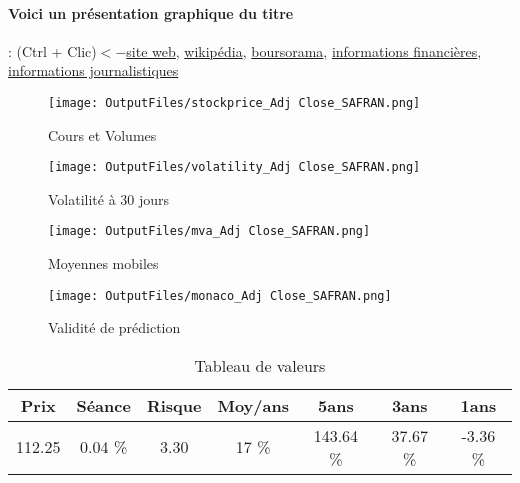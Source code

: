 \documentclass[11pt,a4paper]{report}%
\begin{document}
\paragraph{Voici un présentation graphique du titre} : (Ctrl + Clic)$<-$\href{https://www.safran-group.com/fr/finance/informations-reglementees-0/Informations%20r%C3%A9glement%C3%A9es}{site web}, \href{https://fr.wikipedia.org/wiki/Safran_(entreprise)}{wikipédia}, \href{https://www.boursorama.com/cours/1rPSAF}{boursorama}, \href{https://www.qwant.com/?q=site:https:%2f%2fwww.easybourse.com%2faction-societe%2fSAFRAN&t=web&client=ext-firefox-hp}{informations financières}, \href{https://bourse.lerevenu.com/cours-de-bourse/fiche-valeur-synthese/SAFRAN/SAF-FR}{informations journalistiques}
\begin{figure}[!htb]
   \begin{minipage}{0.5\textwidth}
     \centering
     \texttt{[image: OutputFiles/stockprice\_Adj Close\_SAFRAN.png]}
     \caption{Cours et Volumes}\label{Fig:price_SAFRAN}
   \end{minipage}\hfill
   \begin{minipage}{0.5\textwidth}
     \centering
     \texttt{[image: OutputFiles/volatility\_Adj Close\_SAFRAN.png]}
     \caption{Volatilité à 30 jours}\label{Fig:volat_SAFRAN}
   \end{minipage}
\end{figure}
\begin{figure}[!htb]
   \begin{minipage}{0.5\textwidth}
     \centering
     \texttt{[image: OutputFiles/mva\_Adj Close\_SAFRAN.png]}
     \caption{Moyennes mobiles}\label{Fig:mva_SAFRAN}
   \end{minipage}\hfill
   \begin{minipage}{0.5\textwidth}
     \centering
     \texttt{[image: OutputFiles/monaco\_Adj Close\_SAFRAN.png]}
     \caption{Validité de prédiction}\label{Fig:prediction_SAFRAN}
   \end{minipage}
\end{figure}

\begin{table}[H]
  \centering
    \begin{tabular}{|c|c|c|c|c|c|c|}
    \hline
    Prix & Séance & Risque  & Moy/ans & 5ans & 3ans & 1ans \\
    \hline
    112.25 &    0.04 \%    & 3.30 & 17 \% & 143.64 \% & 37.67 \% & -3.36 \% \\
    \hline
    \end{tabular}%
        \label{tab:table_SAFRAN}%
      \caption{Tableau de valeurs}
\end{table}%
\end{document}
